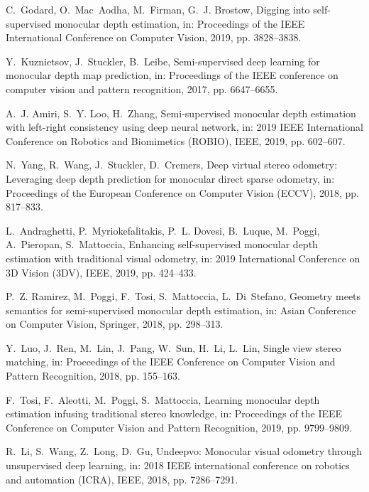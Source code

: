 \documentclass[5p]{elsarticle}
\begin{document}
\begin{thebibliography}{100}
C.~Godard, O.~Mac~Aodha, M.~Firman, G.~J. Brostow, Digging into self-supervised
  monocular depth estimation, in: Proceedings of the IEEE International
  Conference on Computer Vision, 2019, pp. 3828--3838.

Y.~Kuznietsov, J.~Stuckler, B.~Leibe, Semi-supervised deep learning for
  monocular depth map prediction, in: Proceedings of the IEEE conference on
  computer vision and pattern recognition, 2017, pp. 6647--6655.

A.~J. Amiri, S.~Y. Loo, H.~Zhang, Semi-supervised monocular depth estimation
  with left-right consistency using deep neural network, in: 2019 IEEE
  International Conference on Robotics and Biomimetics (ROBIO), IEEE, 2019, pp.
  602--607.

N.~Yang, R.~Wang, J.~Stuckler, D.~Cremers, Deep virtual stereo odometry:
  Leveraging deep depth prediction for monocular direct sparse odometry, in:
  Proceedings of the European Conference on Computer Vision (ECCV), 2018, pp.
  817--833.

L.~Andraghetti, P.~Myriokefalitakis, P.~L. Dovesi, B.~Luque, M.~Poggi,
  A.~Pieropan, S.~Mattoccia, Enhancing self-supervised monocular depth
  estimation with traditional visual odometry, in: 2019 International
  Conference on 3D Vision (3DV), IEEE, 2019, pp. 424--433.

P.~Z. Ramirez, M.~Poggi, F.~Tosi, S.~Mattoccia, L.~Di~Stefano, Geometry meets
  semantics for semi-supervised monocular depth estimation, in: Asian
  Conference on Computer Vision, Springer, 2018, pp. 298--313.

Y.~Luo, J.~Ren, M.~Lin, J.~Pang, W.~Sun, H.~Li, L.~Lin, Single view stereo
  matching, in: Proceedings of the IEEE Conference on Computer Vision and
  Pattern Recognition, 2018, pp. 155--163.

F.~Tosi, F.~Aleotti, M.~Poggi, S.~Mattoccia, Learning monocular depth
  estimation infusing traditional stereo knowledge, in: Proceedings of the IEEE
  Conference on Computer Vision and Pattern Recognition, 2019, pp. 9799--9809.

R.~Li, S.~Wang, Z.~Long, D.~Gu, Undeepvo: Monocular visual odometry through
  unsupervised deep learning, in: 2018 IEEE international conference on
  robotics and automation (ICRA), IEEE, 2018, pp. 7286--7291.


\end{thebibliography}
\end{document}
